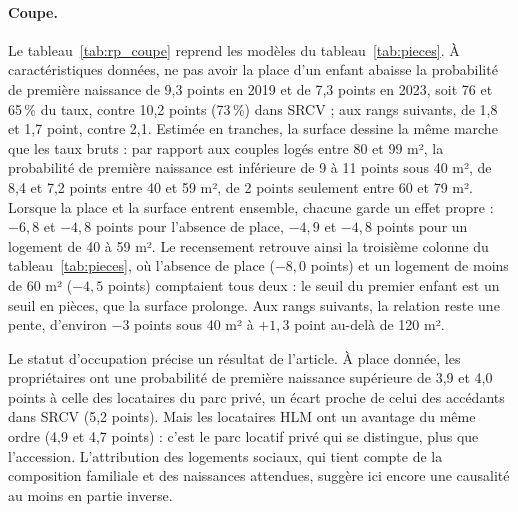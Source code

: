 \documentclass[11pt,a4paper]{article}
\theoremstyle{plain}
\theoremstyle{definition}
\theoremstyle{remark}
\begin{document}
\paragraph{Coupe.} Le tableau~\ref{tab:rp_coupe} reprend les modèles du tableau~\ref{tab:pieces}. À caractéristiques données, ne pas avoir la place d'un enfant abaisse la probabilité de première naissance de 9,3 points en 2019 et de 7,3 points en 2023, soit 76 et 65\,\% du taux, contre 10,2 points (73\,\%) dans SRCV ; aux rangs suivants, de 1,8 et 1,7 point, contre 2,1. Estimée en tranches, la surface dessine la même marche que les taux bruts : par rapport aux couples logés entre 80 et 99 m², la probabilité de première naissance est inférieure de 9 à 11 points sous 40 m², de 8,4 et 7,2 points entre 40 et 59 m², de 2 points seulement entre 60 et 79 m². Lorsque la place et la surface entrent ensemble, chacune garde un effet propre : $-6{,}8$ et $-4{,}8$ points pour l'absence de place, $-4{,}9$ et $-4{,}8$ points pour un logement de 40 à 59 m². Le recensement retrouve ainsi la troisième colonne du tableau~\ref{tab:pieces}, où l'absence de place ($-8{,}0$ points) et un logement de moins de 60 m² ($-4{,}5$ points) comptaient tous deux : le seuil du premier enfant est un seuil en pièces, que la surface prolonge. Aux rangs suivants, la relation reste une pente, d'environ $-3$ points sous 40 m² à $+1{,}3$ point au-delà de 120 m².

Le statut d'occupation précise un résultat de l'article. À place donnée, les propriétaires ont une probabilité de première naissance supérieure de 3,9 et 4,0 points à celle des locataires du parc privé, un écart proche de celui des accédants dans SRCV (5,2 points). Mais les locataires HLM ont un avantage du même ordre (4,9 et 4,7 points) : c'est le parc locatif privé qui se distingue, plus que l'accession. L'attribution des logements sociaux, qui tient compte de la composition familiale et des naissances attendues, suggère ici encore une causalité au moins en partie inverse.
\end{document}

